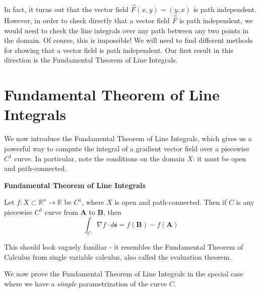 \documentclass{ximera}
\begin{document}
In fact, it turns out that the vector field $\vec{F}(x,y) = (y,x)$ is path independent. However, in order to check directly that a vector field $\vec{F}$ is path independent, we would need to check the line integrals over any path between any two points in the domain. Of course, this is impossible! We will need to find different methods for showing that a vector field is path independent. Our first result in this direction is the Fundamental Theorem of Line Integrals.

\section*{Fundamental Theorem of Line Integrals}

We now introduce the Fundamental Theorem of Line Integrals, which gives us a powerful way to compute the integral of a gradient vector field over a piecewise $C^1$ curve. In particular, note the conditions on the domain $X$: it must be open and path-connected.

\begin{theorem}
\textbf{Fundamental Theorem of Line Integrals}

Let $f:X\subset \mathbb{R}^n\rightarrow \mathbb{R}$ be $C^1$, where $X$ is open and path-connected. Then if $C$ is any piecewise $C^1$ curve from $\textbf{A}$ to $\textbf{B}$, then
\[
\int_C\nabla f\cdot d\textbf{s} = f(\textbf{B})-f(\textbf{A})
\]
\end{theorem}

This should look vaguely familiar - it resembles the Fundamental Theorem of Calculus from single variable calculus, also called the evaluation theorem.

We now prove the Fundamental Theorem of Line Integrals in the special case where we have a \emph{simple} parametrization of the curve $C$.
\end{document}
